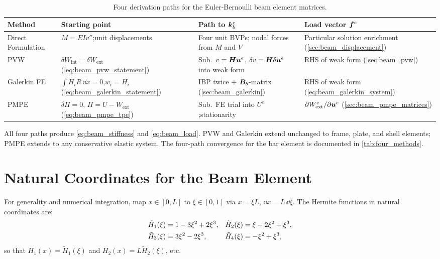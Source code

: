 \begin{table}[htbp]
\centering
\small
\caption{Four derivation paths for the Euler-Bernoulli beam element matrices.}
\label{tab:beam_four_methods}
\begin{tabular}{@{}lp{2.8cm}p{3.8cm}p{3.4cm}@{}}
\toprule
\textbf{Method} & \textbf{Starting point}
  & \textbf{Path to $\bm{k}^e_b$}
  & \textbf{Load vector $\bm{f}^e$} \\
\midrule
Direct Formulation
  & $M = EIv''$;\newline unit displacements
  & Four unit BVPs; nodal forces from $M$ and $V$
  & Particular solution enrichment (\cref{sec:beam_displacement}) \\[6pt]
PVW
  & $\delta W_{\mathrm{int}} = \delta W_{\mathrm{ext}}$ (\cref{eq:beam_pvw_statement})
  & Sub.\ $v = \bm{H}\bm{u}^e$, $\delta v = \bm{H}\delta\bm{u}^e$ into weak form
  & RHS of weak form (\cref{sec:beam_pvw}) \\[6pt]
Galerkin FE
  & $\int H_i R\,\dd x = 0$,\newline $w_i = H_i$ (\cref{eq:beam_galerkin_statement})
  & IBP twice $+$ $\bm{B}_b$-matrix (\cref{sec:beam_galerkin})
  & RHS of weak form (\cref{eq:beam_galerkin_system}) \\[6pt]
PMPE
  & $\delta\Pi = 0$, $\Pi = U - W_{\mathrm{ext}}$ (\cref{eq:beam_pmpe_tpe})
  & Sub.\ FE trial into $U^e$;\newline stationarity
  & $\partial W_{\mathrm{ext}}^e/\partial\bm{u}^e$ (\cref{sec:beam_pmpe_matrices}) \\
\bottomrule
\end{tabular}
\end{table}

All four paths produce \cref{eq:beam_stiffness} and \cref{eq:beam_load}.
PVW and Galerkin extend unchanged to frame, plate, and shell elements;
PMPE extends to any conservative elastic system. The four-path convergence
for the bar element is documented in \cref{tab:four_methods}.

\section{Natural Coordinates for the Beam Element}
\label{sec:beam_natural}

For generality and numerical integration, map $x \in [0, L]$ to
$\xi \in [0, 1]$ via $x = \xi L$, $\dd x = L\,\dd\xi$. The Hermite functions
in natural coordinates are:
\begin{align}
    \tilde{H}_1(\xi) &= 1 - 3\xi^2 + 2\xi^3 , &
    \tilde{H}_2(\xi) &= \xi - 2\xi^2 + \xi^3 , \notag \\
    \tilde{H}_3(\xi) &= 3\xi^2 - 2\xi^3 , &
    \tilde{H}_4(\xi) &= -\xi^2 + \xi^3 ,
    \label{eq:beam_hermite_natural}
\end{align}
so that $H_1(x) = \tilde{H}_1(\xi)$ and $H_2(x) = L\tilde{H}_2(\xi)$, etc.

